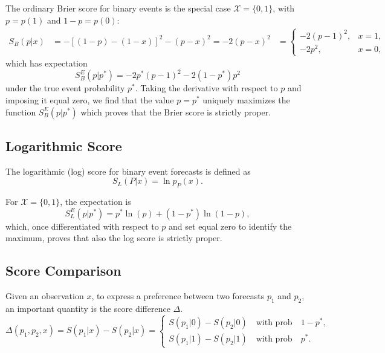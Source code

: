 \documentclass[referee,sn-basic]{sn-jnl}
\theoremstyle{thmstyleone}%
\theoremstyle{thmstyletwo}%
\theoremstyle{thmstylethree}%
\begin{document}
The ordinary Brier score for binary events is the special case $\mathcal X=\{0,1\}$, with $p = p(1)$ and $1-p = p(0)$:
$$
\begin{aligned}
S_B(p\vert x) &= - [(1-p) - (1-x)]^2 - (p-x)^2 = -2(p-x)^2
&=
\begin{cases}
-2(p-1)^2, & x=1,\\
-2p^2, & x=0,
\end{cases}
\end{aligned}
$$
which has expectation
\begin{equation}
S^E_B(p\vert p^*) =
-2p^*(p-1)^2 - 2(1-p^*)p^2 
\label{eq:exp_brier}
\end{equation}
under the true event probability $p^*$. Taking the derivative with respect to $p$ and imposing it equal zero, we find that the value $p = p^*$ uniquely maximizes the function $S^E_B(p\vert p^*)$ which proves that the Brier score is strictly proper. 

\subsection{ Logarithmic Score }

The logarithmic (log) score for binary event forecasts is defined as
\begin{equation}
S_L(P\vert x) = \ln p_P(x) .
\label{eq:log_def}
\end{equation}

For $\mathcal X=\{0,1\}$, the expectation is
\begin{equation}
S^E_L(p\vert p^*) = p^* \ln(p) + (1-p^*) \ln(1-p)  ,
\label{eq:exp_log}
\end{equation}
which, once differentiated with respect to $p$ and set equal zero to identify the maximum, proves that also the log score is strictly proper.

\subsection{ Score Comparison }

Given an observation $x$, to express a preference between two forecasts $p_1$ and $p_2$, an important quantity is the score difference $\Delta$.
$$
\Delta(p_1,p_2,x) = S(p_1\vert x) - S(p_2\vert x) = 
\begin{cases}
S(p_1\vert 0) - S(p_2\vert 0) \quad \text{with prob} \quad 1 - p^*, \\
S(p_1\vert 1) - S(p_2\vert 1) \quad \text{with prob} \quad p^* .
\end{cases}
$$ 
\end{document}

